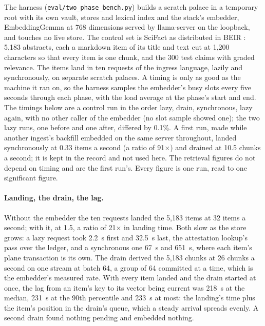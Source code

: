 \documentclass[11pt]{article}
\theoremstyle{plain}
\theoremstyle{definition}
\theoremstyle{remark}
\newcommand{\code}[1]{\texttt{#1}}
\newcommand{\nItems}{5{,}183}
\newcommand{\nQueries}{300}
\newcommand{\lazyRate}{32}
\newcommand{\syncRate}{1.5}
\newcommand{\speedup}{21}
\newcommand{\drainRate}{26}
\newcommand{\lagMedian}{218}
\newcommand{\lagNinety}{231}
\newcommand{\lagMax}{233}
\newcommand{\lazyDrift}{0.1}
\newcommand{\firstSyncRate}{0.33}
\newcommand{\firstRatio}{91}
\newcommand{\firstDrainRate}{10.5}
\newcommand{\planFirst}{2.2}
\newcommand{\planLast}{32.5}
\newcommand{\syncPlanFirst}{67}
\newcommand{\syncPlanLast}{651}
\begin{document}
The harness (\code{eval/two\_phase\_bench.py}) builds a scratch palace in a temporary root with its
own vault, stores and lexical index and the stack's embedder, EmbeddingGemma at 768 dimensions
served by llama-server on the loopback, and touches no live store. The control set is SciFact
\citep{wadden2020scifact} as distributed in BEIR \citep{thakur2021beir}: \nItems{} abstracts, each
a markdown item of its title and text cut at 1{,}200 characters so that every item is one chunk,
and the \nQueries{} test claims with graded relevance. The items land in ten requests of the
ingress language, lazily and synchronously, on separate scratch palaces. A timing is only as good
as the machine it ran on, so the harness samples the embedder's busy slots every five seconds
through each phase, with the load average at the phase's start and end. The timings below are a
control run in the order lazy, drain, synchronous, lazy again, with no other caller of the
embedder (no slot sample showed one); the two lazy runs, one before and one after, differed by
\lazyDrift\%. A first run, made while another ingest's backfill
embedded on the same server throughout, landed synchronously at \firstSyncRate{} items a second
(a ratio of \firstRatio$\times$) and drained at \firstDrainRate{} chunks a second; it is kept in
the record and not used here. The retrieval figures do not depend on timing and are the
first run's. Every figure is one run, read to one significant figure.

\paragraph{Landing, the drain, the lag.} Without the embedder the ten requests landed the \nItems{}
items at \lazyRate{} items a second; with it, at \syncRate{}, a ratio of \speedup$\times$ in landing
time. Both slow as the store grows: a lazy request took \planFirst{}~s first and \planLast{}~s
last, the attestation lookup's pass over the ledger, and a synchronous one \syncPlanFirst{}~s and
\syncPlanLast{}~s, where each item's plane transaction is its own. The drain derived the \nItems{}
chunks at \drainRate{} chunks a second on one stream at batch 64, a group of 64 committed at a
time, which is the embedder's measured rate. With every item landed and the drain started at
once, the lag from an item's key to its vector being current was \lagMedian{}~s at the median,
\lagNinety{}~s at the 90th percentile and \lagMax{}~s at most: the landing's time plus the
item's position in the drain's queue, which a steady arrival spreads evenly. A second drain found
nothing pending and embedded nothing.
\end{document}
